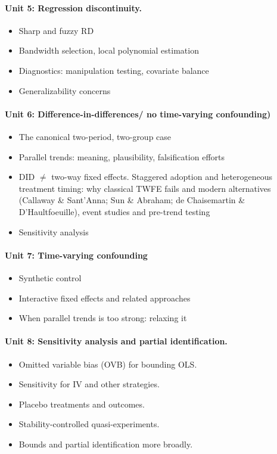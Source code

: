 \documentclass[PS]{syllabus}
\begin{document}
\begin{syllabus}
\paragraph{Unit 5: Regression discontinuity.}
\begin{itemize}
\item Sharp and fuzzy RD
\item Bandwidth selection, local polynomial estimation
\item Diagnostics: manipulation testing, covariate balance
\item Generalizability concerns
\end{itemize}

\paragraph{Unit 6: Difference-in-differences/ no time-varying confounding)}
\begin{itemize}
\item The canonical two-period, two-group case
\item Parallel trends: meaning, plausibility, falsification efforts
\item DID $\neq$ two-way fixed effects. Staggered adoption and heterogeneous treatment timing: why classical TWFE fails and modern alternatives (Callaway \& Sant'Anna; Sun \& Abraham; de Chaisemartin \& D'Haultfoeuille), event studies and pre-trend testing
\item Sensitivity analysis
\end{itemize}

\paragraph{Unit 7: Time-varying confounding}
\begin{itemize}
\item Synthetic control
\item Interactive fixed effects and related approaches
\item When parallel trends is too strong: relaxing it
\end{itemize}

\paragraph{Unit 8: Sensitivity analysis and partial identification.}
\begin{itemize}
\item Omitted variable bias (OVB) for bounding OLS.
\item Sensitivity for IV and other strategies.
\item Placebo treatments and outcomes.
\item Stability-controlled quasi-experiments.
\item Bounds and partial identification more broadly.
\end{itemize}


\end{syllabus}
\end{document}

